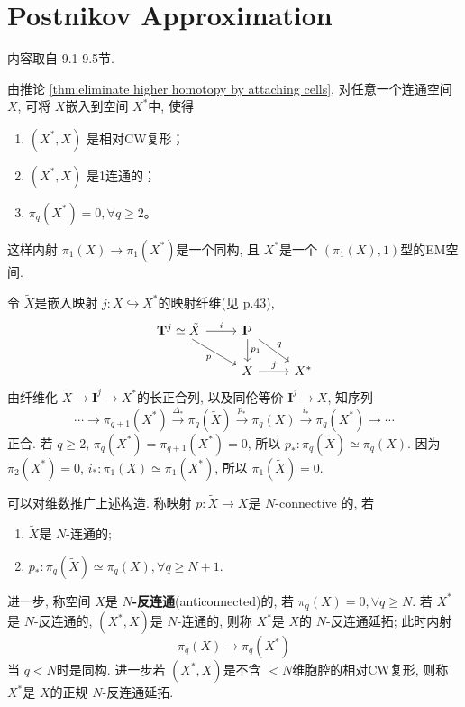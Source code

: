 \documentclass{ctexart}
\theoremstyle{plain}
\theoremstyle{definition}
\renewcommand{\emph}{\textbf}
\begin{document}
    \section{Postnikov Approximation}
        内容取自\cite{Whitehead1978} 9.1-9.5节.

        由推论 \ref{thm:eliminate higher homotopy by attaching cells}, 对任意一个连通空间 $X$, 可将 $X$嵌入到空间 $X^{*}$中, 使得 
        \begin{enumerate}
            \item $(X^*, X)$ 是相对CW复形；
            \item $(X^*, X)$ 是1连通的；
            \item $\pi_q(X^*) = 0, \forall q \geq 2$。
        \end{enumerate}
        这样内射 $\pi_1(X)\to \pi_1(X^{*})$是一个同构, 且 $X^{*}$是一个 $(\pi_1(X),1)$型的EM空间.

        令 $\tilde{X}$是嵌入映射 $j:X\hookrightarrow X^{*}$的映射纤维(见 \cite{Whitehead1978} p.43), 
        \begin{equation*}
            \begin{tikzcd}
                \mathbf{T}^j\simeq \tilde{X} \arrow[r, "i"] \arrow[dr, "p"'] & \mathbf{I}^j \arrow[d, "p_1"] \arrow[dr, "q"] & \\
                & X \arrow[r, "j"] & X^{*}
            \end{tikzcd}
        \end{equation*}
        由纤维化 $\tilde{X}\to \mathbf{I}^{j}\to X^{*}$的长正合列, 以及同伦等价 $\mathbf{I}^{j}\to X$, 知序列
        \begin{equation*}
            \cdots \rightarrow \pi_{q+1}\left(X^*\right) \xrightarrow{\Delta_*} \pi_q(\tilde{X}) \xrightarrow{p_*} \pi_q(X) \xrightarrow{i_*} \pi_q\left(X^*\right) \rightarrow \cdots
        \end{equation*}
        正合. 若 $q\ge 2$, $\pi_{q}(X^{*})=\pi_{q+1}(X^{*})=0$, 所以 $p_*: \pi_{q}(\tilde{X})\simeq \pi_{q}(X)$. 因为 $\pi_2(X^{*})=0$, $i_*:\pi_1(X)\simeq \pi_1(X^{*})$, 所以 $\pi_1(\tilde{X})=0$.

        可以对维数推广上述构造. 称映射 $p:\tilde{X}\to X$是 $N$-connective 的, 若 
        \begin{enumerate}
            \item $\tilde{X}$是 $N$-连通的;
            \item $p_*:\pi_{q}(\tilde{X})\simeq \pi_{q}(X), \forall q\ge N+1$.
        \end{enumerate}
        进一步, 称空间 $X$是 \emph{$N$-反连通}(anticonnected)的, 若 $\pi_{q}(X)=0, \forall q\ge N$. 若 $X^{*}$是 $N$-反连通的, $(X^{*},X)$是 $N$-连通的, 则称 $X^{*}$是 $X$的 $N$-反连通延拓; 此时内射
        \begin{equation*}
          \pi_{q}(X)\to \pi_{q}(X^{*})
        \end{equation*}
        当 $q<N$时是同构. 进一步若 $(X^{*},X)$是不含 $<N$维胞腔的相对CW复形, 则称 $X^{*}$是 $X$的正规 $N$-反连通延拓.   
\end{document}
